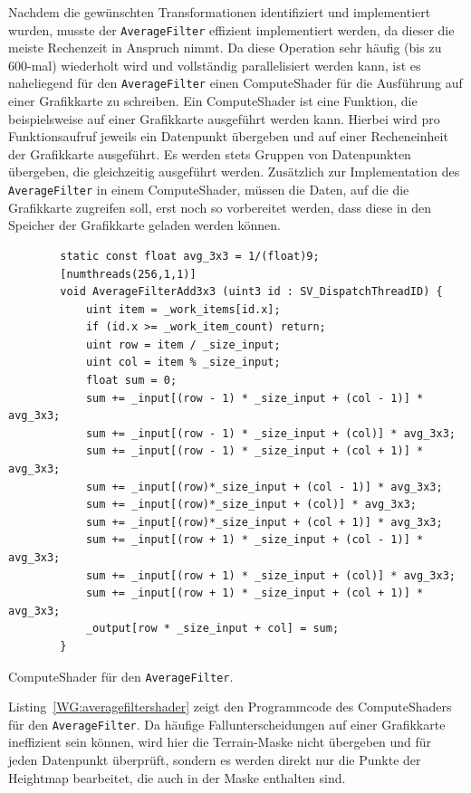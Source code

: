 Nachdem die gewünschten Transformationen identifiziert und implementiert wurden, musste der \texttt{AverageFilter} effizient implementiert werden, da dieser die meiste Rechenzeit in Anspruch nimmt.
Da diese Operation sehr häufig (bis zu 600-mal) wiederholt wird und vollständig parallelisiert werden kann, ist es naheliegend für den \texttt{AverageFilter} einen ComputeShader für die Ausführung auf einer Grafikkarte zu schreiben.
Ein ComputeShader ist eine Funktion, die beispielsweise auf einer Grafikkarte ausgeführt werden kann.
Hierbei wird pro Funktionsaufruf jeweils ein Datenpunkt übergeben und auf einer Recheneinheit der Grafikkarte ausgeführt.
Es werden stets Gruppen von Datenpunkten übergeben, die gleichzeitig ausgeführt werden.
Zusätzlich zur Implementation des \texttt{AverageFilter} in einem ComputeShader, müssen die Daten, auf die die Grafikkarte zugreifen soll, erst noch so vorbereitet werden, dass diese in den Speicher der Grafikkarte geladen werden können.
\begin{listing}
    \begin{verbatim}
        static const float avg_3x3 = 1/(float)9;
        [numthreads(256,1,1)]
        void AverageFilterAdd3x3 (uint3 id : SV_DispatchThreadID) {
            uint item = _work_items[id.x];
            if (id.x >= _work_item_count) return;
            uint row = item / _size_input;
            uint col = item % _size_input;
            float sum = 0;
            sum += _input[(row - 1) * _size_input + (col - 1)] * avg_3x3;
            sum += _input[(row - 1) * _size_input + (col)] * avg_3x3;
            sum += _input[(row - 1) * _size_input + (col + 1)] * avg_3x3;
            sum += _input[(row)*_size_input + (col - 1)] * avg_3x3;
            sum += _input[(row)*_size_input + (col)] * avg_3x3;
            sum += _input[(row)*_size_input + (col + 1)] * avg_3x3;
            sum += _input[(row + 1) * _size_input + (col - 1)] * avg_3x3;
            sum += _input[(row + 1) * _size_input + (col)] * avg_3x3;
            sum += _input[(row + 1) * _size_input + (col + 1)] * avg_3x3;
            _output[row * _size_input + col] = sum;
        }
    \end{verbatim}
    \caption{ComputeShader für den \texttt{AverageFilter}.}
    \label{WG:averagefiltershader}
\end{listing}
Listing~\ref{WG:averagefiltershader} zeigt den Programmcode des ComputeShaders für den \texttt{AverageFilter}.
Da häufige Fallunterscheidungen auf einer Grafikkarte ineffizient sein können, wird hier die Terrain-Maske nicht übergeben und für jeden Datenpunkt überprüft, sondern es werden direkt nur die Punkte der Heightmap bearbeitet, die auch in der Maske enthalten sind.
